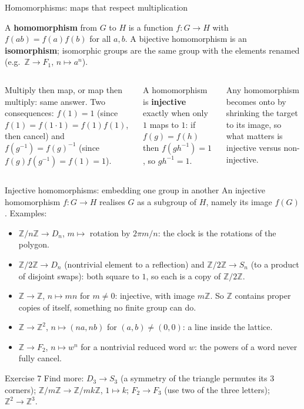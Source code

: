 \documentclass[aspectratio=169,10pt]{beamer}
\newcommand{\Z}{\mathbb{Z}}
\newcommand{\inv}{^{-1}}
\begin{document}
\begin{frame}{Homomorphisms: maps that respect multiplication}
\begin{defbox}
A \textbf{homomorphism} from $G$ to $H$ is a function $f:G\to H$ with $f(ab)=f(a)f(b)$ for all $a,b$. A bijective homomorphism is an \textbf{isomorphism}; isomorphic groups are the same group with the elements renamed (e.g.\ $\Z\to F_1$, $n\mapsto a^n$).
\end{defbox}
\begin{columns}[T]
\centering\scalebox{0.85}{\fighom}\par
{\scriptsize Multiply then map, or map then multiply: same answer.}
Two consequences: $f(1)=1$ (since $f(1)=f(1\cdot1)=f(1)f(1)$, then cancel) and $f(g\inv)=f(g)\inv$ (since $f(g)f(g\inv)=f(1)=1$).
\vspace{4pt}

A homomorphism is \textbf{injective} exactly when only $1$ maps to $1$: if $f(g)=f(h)$ then $f(gh\inv)=1$, so $gh\inv=1$.
\vspace{4pt}

Any homomorphism becomes onto by shrinking the target to its image, so what matters is injective versus non-injective.
\end{columns}
\end{frame}

\begin{frame}{Injective homomorphisms: embedding one group in another}
An injective homomorphism $f:G\to H$ realises $G$ as a subgroup of $H$, namely its image $f(G)$. Examples:
\begin{itemize}
\item $\Z/n\Z\to D_n$, $m\mapsto$ rotation by $2\pi m/n$: the clock is the rotations of the polygon.
\item $\Z/2\Z\to D_n$ (nontrivial element to a reflection) and $\Z/2\Z\to S_n$ (to a product of disjoint swaps): both square to $1$, so each is a copy of $\Z/2\Z$.
\item $\Z\to\Z$, $n\mapsto mn$ for $m\neq0$: injective, with image $m\Z$. So $\Z$ contains proper copies of itself, something no finite group can do.
\item $\Z\to\Z^2$, $n\mapsto(na,nb)$ for $(a,b)\neq(0,0)$: a line inside the lattice.
\item $\Z\to F_2$, $n\mapsto w^n$ for a nontrivial reduced word $w$: the powers of a word never fully cancel.
\end{itemize}
\begin{exbox}{Exercise 7}
Find more: $D_3\to S_3$ (a symmetry of the triangle permutes its 3 corners); $\Z/m\Z\to\Z/mk\Z$, $1\mapsto k$; $F_2\to F_3$ (use two of the three letters); $\Z^2\to\Z^3$.
\end{exbox}
\end{frame}
\end{document}
